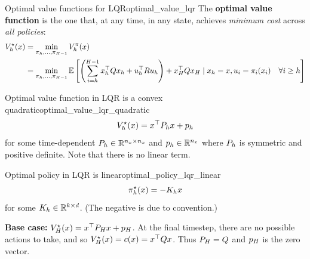 \documentclass[../main/main]{subfiles}
\begin{document}
\begin{definition}[breakable=false]{Optimal value functions for LQR}{optimal_value_lqr}
    The \textbf{optimal value function} is the one that, at any time, in any state,
    achieves \emph{minimum cost} across \emph{all policies}: \[
        \begin{split}
            V^\star_h(x) &= \min_{\pi_h, \dots, \pi_{H-1}} V^\pi_h(x) \\
            &= \min_{\pi_{h}, \dots, \pi_{H-1}} \operatorname*{\mathbb{E}} \left[ \left( \sum_{i=h}^{H-1} x_h^\top Q x_h + u_h^\top R u_h \right) + x_H^\top Q x_H
            \mid x_h = x, u_i = \pi_i(x_i) \quad \forall i \ge h \right] \\
        \end{split}
    \]
\end{definition}

\begin{theorem}{Optimal value function in LQR is a convex quadratic}{optimal_value_lqr_quadratic}
    \[
        V^\star_h(x) = x^\top P_h x + p_h
    \]
    for some time-dependent $P_h \in \mathbb{R}^{n_x \times n_x}$ and $p_h \in \mathbb{R}^{n_x}$ where $P_h$ is symmetric and positive definite. Note that there is no linear term.
\end{theorem}

\begin{theorem}{Optimal policy in LQR is linear}{optimal_policy_lqr_linear}
    \[
        \pi^\star_h (x) = - K_h x
    \]
    for some $K_h \in \mathbb{R}^{k \times d}$. (The negative is due to convention.)
\end{theorem}





\textbf{Base case:} $V^\star_H(x) = x^\top P_H x + p_H$. At the final timestep, there are no possible actions to take, and so $V^\star_H(x) = c(x) = x^\top Q x$. Thus $P_H = Q$ and $p_H$ is the zero vector.
\end{document}
